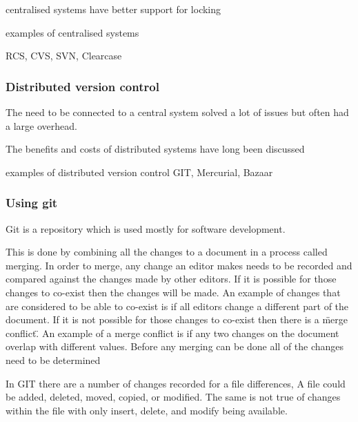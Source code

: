 centralised systems have better support for locking  

examples of centralised systems

RCS, CVS, SVN, Clearcase


\subsubsection{Distributed version control}
The need to be connected to a central system solved a lot of issues but often had a large overhead.  


The benefits and costs of distributed systems have long been discussed

examples of distributed version control
GIT, Mercurial, Bazaar


\subsubsection{Using git}
Git is a repository which is used mostly for software development.

This is done by combining all the changes to a document in a process called merging. 
In order to merge, any change an editor makes needs to be recorded and compared against the changes made by other editors.
If it is possible for those changes to co-exist then the changes will be made.
An example of changes that are considered to be able to co-exist is if all editors change a different part of the document.
If it is not possible for those changes to co-exist then there is a \"merge conflict\".
An example of a merge conflict is if any two changes on the document overlap with different values.
Before any merging can be done all of the changes need to be determined

In GIT there are a number of changes recorded for a file differences,  A file could be added, deleted, moved, copied, or modified.  The same is not true of changes within the file with only insert, delete, and modify being available.

